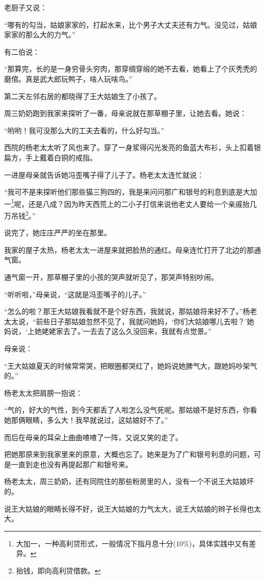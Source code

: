 \par 老厨子又说：
\par “哪有的勾当，姑娘家家的，打起水来，比个男子大丈夫还有力气。没见过，姑娘家家的那么大的力气。”
\par 有二伯说：
\par “那算完，长的是一身穷骨头穷肉，那穿绸穿缎的她不去看，她看上了个灰秃秃的磨倌。真是武大郎玩鸭子，啥人玩啥鸟。”
\par 第二天左邻右居的都晓得了王大姑娘生了小孩了。
\par 周三奶奶跑到我家来探听了一番，母亲说就在那草棚子里，让她去看。她说：
\par “哟哟！我可没那么大的工夫去看的，什么好勾当。”
\par 西院的杨老太太听了风也来了。穿了一身浆得闪光发亮的鱼蓝大布衫，头上扣着银扁方，手上戴着白铜的戒指。
\par 一进屋母亲就告诉她冯歪嘴子得了儿子了。杨老太太连忙就说：
\par “我可不是来探听他们那些猫三狗四的，我是来问问那广和银号的利息到底是大加一\footnote{大加一，一种高利贷形式，一般情况下指月息十分(10\%)，具体实践中又有差异。}呢，还是八成？因为昨天西荒上的二小子打信来说他老丈人要给一个亲戚抬几万吊钱\footnote{抬钱，即向高利贷借款。}。”
\par 说完了，她庄庄严严的坐在那里。
\par 我家的屋子太热，杨老太太一进屋来就把脸热的通红。母亲连忙打开了北边的那通气窗。
\par 通气窗一开，那草棚子里的小孩的哭声就听见了，那哭声特别吵闹。
\par “听听啦，”母亲说，“这就是冯歪嘴子的儿子。”
\par “怎么的啦？那王大姑娘我看就不是个好东西，我就说，那姑娘将来好不了。”杨老太太说，“前些日子那姑娘忽然不见了，我就问她妈，‘你们大姑娘哪儿去啦？’她妈说，‘上她姥姥家去了。’一去去了这么久没回来，我就有点觉景。”
\par 母亲说：
\par “王大姑娘夏天的时候常常哭，把眼圈都哭红了，她妈说她脾气大，跟她妈吵架气的。”
\par 杨老太太把肩膀一抱说：
\par “气的，好大的气性，到今天都丢了人啦怎么没气死呢。那姑娘不是好东西，你看她那俩眼睛，多么大！我早就说过，这姑娘好不了。”
\par 而后在母亲的耳朵上曲曲喳喳了一阵，又说又笑的走了。
\par 把她那原来到我家里来的原意，大概也忘了。她来是为了广和银号利息的问题，可是一直到走也没有再提起那广和银号来。
\par 杨老太太，周三奶奶，还有同院住的那些粉房里的人，没有一个不说王大姑娘坏的。
\par 说王大姑娘的眼睛长得不好，说王大姑娘的力气太大，说王大姑娘的辫子长得也太大。
